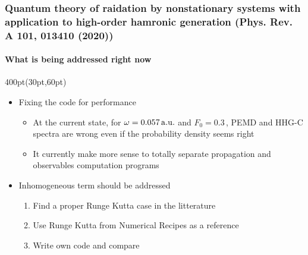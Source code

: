 \begin{frame}
\frametitle{Quantum theory of raidation by nonstationary systems 
	with application to high-order hamronic generation
        (Phys. Rev. A 101, 013410 (2020))}
	\framesubtitle{What is being addressed right now}
\small

\begin{textblock*}{400pt}(30pt,60pt)
\footnotesize
\begin{itemize}
\item Fixing the code for performance
\begin{itemize}
\footnotesize
\item[$\bullet$] At the current state, for $\omega=0.057\,\rm a.u.$
and $F_0=0.3\,$, PEMD and HHG-C spectra are wrong even if 
the probability density seems right
\item[$\bullet$] It currently make more sense to totally separate 
propagation and observables computation programs
\end{itemize}
\item Inhomogeneous term should be addressed
\begin{enumerate}
\footnotesize
\item[$\bullet$] Find a proper Runge Kutta case in the litterature
\item[$\bullet$] Use Runge Kutta from Numerical Recipes as a reference
\item[$\bullet$] Write own code and compare 
\end{enumerate}

\end{itemize}

\end{textblock*}

\end{frame}







